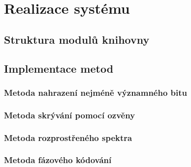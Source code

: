 
\chapter{Realizace systému}
\label{cha:implementation}


\blindtext

\section{Struktura modulů knihovny}
\label{sec:modules}


\blindtext

\blindtext

\blindtext

\section{Implementace metod}
\label{sec:method-implementation}

\subsection*{Metoda nahrazení nejméně významného bitu}
\label{sub:lsb-implementation}

\blindtext

\subsection*{Metoda skrývání pomocí ozvěny}
\label{sub:echo-hiding-implementation}

\blindtext

\subsection*{Metoda rozprostřeného spektra}
\label{sub:dsss-implementation}

\blindtext

\subsection*{Metoda fázového kódování}
\label{sub:phase-coding-implementation}

